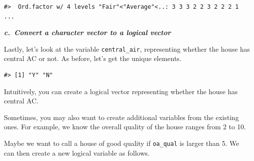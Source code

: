 \documentclass[
]{book}
\newenvironment{Shaded}{\begin{snugshade}}{\end{snugshade}}
\newcommand{\DecValTok}[1]{\textcolor[rgb]{0.00,0.00,0.81}{#1}}
\newcommand{\FunctionTok}[1]{\textcolor[rgb]{0.00,0.00,0.00}{#1}}
\newcommand{\NormalTok}[1]{#1}
\newcommand{\OtherTok}[1]{\textcolor[rgb]{0.56,0.35,0.01}{#1}}
\newcommand{\SpecialCharTok}[1]{\textcolor[rgb]{0.00,0.00,0.00}{#1}}
\newcommand{\StringTok}[1]{\textcolor[rgb]{0.31,0.60,0.02}{#1}}
\begin{document}
\begin{verbatim}
#>  Ord.factor w/ 4 levels "Fair"<"Average"<..: 3 3 3 2 2 3 2 2 2 1 ...
\end{verbatim}

\textbf{\emph{c.~Convert a character vector to a logical vector}}

Lastly, let's look at the variable \texttt{central\_air}, representing whether the house has central AC or not. As before, let's get the unique elements.

\begin{Shaded}
\end{Shaded}

\begin{verbatim}
#> [1] "Y" "N"
\end{verbatim}

Intuitively, you can create a logical vector representing whether the house has central AC.

\begin{Shaded}
\end{Shaded}

Sometimes, you may also want to create additional variables from the existing ones. For example, we know the overall quality of the house ranges from 2 to 10.

\begin{Shaded}
\end{Shaded}

Maybe we want to call a house of good quality if \texttt{oa\_qual} is larger than 5. We can then create a new logical variable as follows.

\begin{Shaded}
\end{Shaded}
\end{document}
